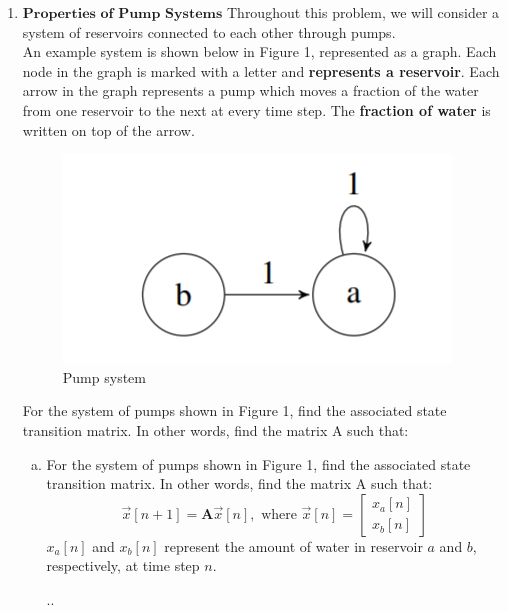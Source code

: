 \documentclass[11pt]{article}
\def\A{\textbf{A}} %
\begin{document}
\begin{enumerate}
	      \newpage
	\item $\textbf{Properties of Pump Systems}$
	      Throughout this problem, we will consider a system of reservoirs connected to each other through pumps.\\An example system is shown below in Figure 1, represented as a graph. Each node in the graph is marked with a letter and \textbf{represents a reservoir}. Each arrow in the graph represents a pump which moves a fraction of the water from one reservoir to the next at every time step. The \textbf{fraction of water} is written on top of the arrow.
	    \begin{figure}[h]
            \centering
            \includegraphics[scale=0.9]{q4a}
            \caption{ Pump system}
        \end{figure}
        
        For the system of pumps shown in Figure 1, find the associated state transition matrix. In other words, find the matrix A such that:
        \begin{enumerate}[(a)]
            \item For the system of pumps shown in Figure 1, find the associated state transition matrix. In other words, find the matrix A such that:
            \[
                \vec{x}[n+1] = \A\vec{x}[n],\text{ where }\vec x[n] = \begin{bmatrix}
                                                                        x_a[n] \\
                                                                        x_b[n]
                                                                      \end{bmatrix}
            \]
            $x_a[n]$ and $x_b[n]$ represent the amount of water in reservoir $a$ and $b$, respectively, at time step $n$.
            \begin{Answer}
                ..
            \end{Answer}
            

\end{enumerate}
\end{enumerate}
\end{document}
